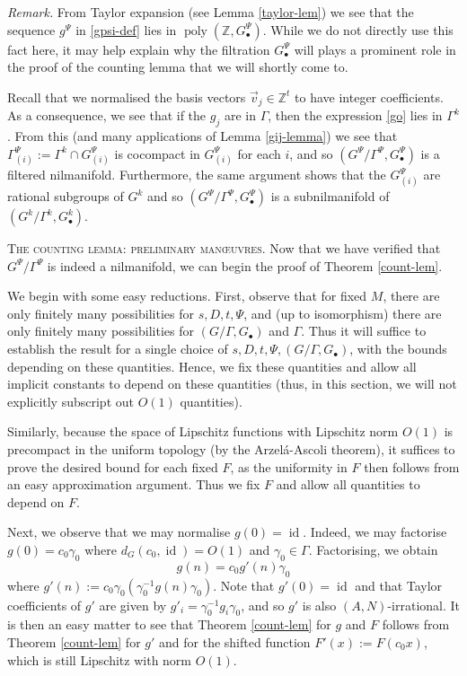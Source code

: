 \documentclass[11pt,reqno]{amsart}
\numberwithin{equation}{section}
\theoremstyle{plain}
\theoremstyle{definition}
\newcommand\Z{\mathbb{Z}}
\newcommand\1{{\bf 1}}
\newcommand\2{{\bf 2}}
\newcommand\poly{\operatorname{poly}}
\newcommand\id{\operatorname{id}}
\begin{document}
\emph{Remark.} From Taylor expansion (see Lemma \ref{taylor-lem}) we see that the sequence $g^\Psi$ in \eqref{gpsi-def} lies in $\poly(\Z,G^\Psi_\bullet)$.  While we do not directly use this fact here, it may help explain why the filtration $G^\Psi_\bullet$ will plays a prominent role in the proof of the counting lemma that we will shortly come to.

Recall that we normalised the basis vectors $\vec{v}_{j} \in \Z^t$ to have integer coefficients.  As a consequence, we see that if the $g_{j}$ are in $\Gamma$, then the expression \eqref{go} lies in $\Gamma^k$. From this (and many applications of Lemma \ref{gij-lemma}) we see that $\Gamma^{\Psi}_{(i)} := \Gamma^k \cap G^{\Psi}_{(i)}$ is cocompact in $G^{\Psi}_{(i)}$ for each $i$, and so $(G^{\Psi}/\Gamma^{\Psi}, G^{\Psi}_\bullet)$ is a filtered nilmanifold.  Furthermore, the same argument shows that the $G^{\Psi}_{(i)}$ are rational subgroups of $G^k$ and so $(G^{\Psi}/\Gamma^{\Psi}, G^{\Psi}_\bullet)$ is a subnilmanifold of $(G^k/\Gamma^k, G^k_\bullet)$.\vspace{11pt}

\textsc{The counting lemma: preliminary man{\oe}uvres.} Now that we have verified that $G^{\Psi}/\Gamma^{\Psi}$ is indeed a nilmanifold, we can begin the proof of Theorem \ref{count-lem}. 

We begin with some easy reductions.  
First, observe that for fixed $M$, there are only finitely many possibilities for $s,D,t,\Psi$, and (up to isomorphism) there are only finitely many possibilities for $(G/\Gamma,G_\bullet)$ and $\Gamma$.  Thus it will suffice to establish the result for a single choice of $s,D,t,\Psi,(G/\Gamma, G_\bullet)$, with the bounds depending on these quantities.  Hence, we fix these quantities and allow all implicit constants to depend on these quantities (thus, in this section, we will not explicitly subscript out $O(1)$ quantities).

Similarly, because the space of Lipschitz functions with Lipschitz norm $O(1)$ is precompact in the uniform topology (by the Arzel\'a-Ascoli theorem), it suffices to prove the desired bound for each fixed $F$, as the uniformity in $F$ then follows from an easy approximation argument.  Thus we fix $F$ and allow all quantities to depend on $F$.

Next, we observe that we may normalise $g(0) = \id$.  Indeed, we may factorise $g(0) = c_0 \gamma_0$ where $d_G(c_0,\id) = O(1)$ and $\gamma_0 \in \Gamma$.  Factorising, we obtain
$$ g(n) = c_0 g'(n) \gamma_0$$
where $g'(n) := c_0\gamma_0 (\gamma_0^{-1}g(n)\gamma_0)$. Note that $g'(0) = \id$ and that Taylor coefficients of $g'$ are given by $g'_i = \gamma_0^{-1} g_i \gamma_0$, and so $g'$ is also $(A,N)$-irrational.  It is then an easy matter to see that Theorem \ref{count-lem} for $g$ and $F$ follows from Theorem \ref{count-lem} for $g'$ and for the shifted function $F'(x) := F(c_0 x)$, which is still Lipschitz with norm $O(1)$.  
\end{document}
